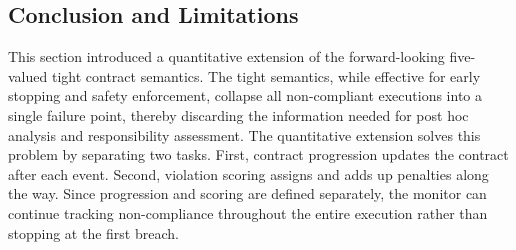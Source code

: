   
  
  
  
  


\subsection{Conclusion and Limitations}

This section introduced a quantitative extension of the forward-looking five-valued tight contract semantics.
The tight semantics, while effective for early stopping and safety enforcement, collapse all non-compliant executions into a single failure point, thereby discarding the information needed for post hoc analysis and responsibility assessment.
The quantitative extension solves this problem by separating two tasks. First, contract progression updates the contract after each event. Second, violation scoring assigns and adds up penalties along the way.
Since progression and scoring are defined separately, the monitor can continue tracking non-compliance throughout the entire execution rather than stopping at the first breach.

